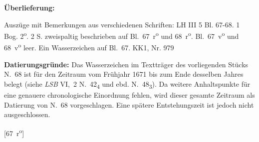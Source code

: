 \begin{ledgroupsized}[r]{120mm}%
\footnotesize%
\pstart%
\noindent\textbf{\"{U}berlieferung:}%
\pend%
\end{ledgroupsized}%
\begin{ledgroupsized}[r]{114mm}%
\footnotesize%
\pstart%
\parindent -6mm%
%
Auszüge mit Bemerkungen aus verschiedenen Schriften:
LH III 5 Bl. 67-68.
1 Bog. 2\textsuperscript{o}.
2 S. zweispaltig beschrieben auf Bl.~67~r\textsuperscript{o} und 68~r\textsuperscript{o}.
Bl.~67~v\textsuperscript{o} und 68~v\textsuperscript{o} leer.
Ein Wasserzeichen auf Bl.~67.%
\newline%
KK1, Nr. 979%
\pend%
\end{ledgroupsized}%
\vspace*{5mm}%
\begin{ledgroup}%
\footnotesize%
\pstart%
\noindent%
\footnotesize{%
\textbf{Datierungsgr\"{u}nde:}
Das Wasserzeichen im Textträger des vorliegenden Stücks N.~68
ist für den Zeit\-raum vom Frühjahr 1671 bis zum Ende desselben Jahres belegt (siehe \textit{LSB} VI,~2 N.~42\textsubscript{4} und ebd. N.~48\textsubscript{3}).
Da weitere An\-halts\-punk\-te für eine genauere chronologische Einordnung fehlen, wird dieser gesamte Zeitraum als Datierung von N.~68
vorgeschlagen.  Eine spätere Entstehungszeit ist jedoch nicht ausgeschlossen.}%
\pend%
\end{ledgroup}%
%
\vspace{6mm}%
\count{}
\count{}
\count{}
\pstart%
\normalsize%
\noindent%
[67~r\textsuperscript{o}]
\protect{}
